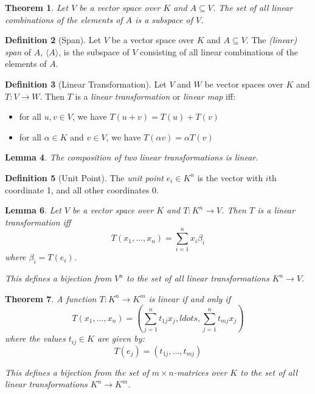 \documentclass{book}
\newtheorem{lm}{Lemma}[chapter]
\newtheorem{thm}[lm]{Theorem}
\theoremstyle{definition}
\newtheorem{df}[lm]{Definition}
\begin{document}
  \begin{thm}
    Let $V$ be a vector space over $K$ and $A \subseteq V$. The set of all 
    linear 
    combinations of the elements of $A$ is a subspace of $V$.
  \end{thm}
  
  \begin{df}[Span]
    Let $V$ be a vector space over $K$ and $A \subseteq V$. The \emph{(linear) 
      span} of $A$, $\langle A \rangle$, is the subspace of $V$ consisting of 
    all 
    linear 
    combinations of the elements of $A$.
  \end{df}
  
  \begin{df}[Linear Transformation]
    Let $V$ and $W$ be vector spaces over $K$ and $T : V \rightarrow W$. Then 
    $T$ 
    is a \emph{linear transformation} or \emph{linear map} iff:
    \begin{itemize}
      \item for all $u, v \in V$, we have $T(u + v) = T(u) + T(v)$
      \item for all $\alpha \in K$ and $v \in V$, we have $T(\alpha v) = \alpha 
      T(v)$
    \end{itemize}
  \end{df}
  
  \begin{lm}
    The composition of two linear transformations is linear.
  \end{lm}
  
  \begin{df}[Unit Point]
    The \emph{unit point} $e_i \in K^n$ is the vector with $i$th coordinate 1, 
    and all other coordinates 0.
  \end{df}
  
  \begin{lm}
    Let $V$ be a vector space over $K$ and $T : K^n \rightarrow V$. Then $T$ is 
    a 
    linear transformation iff
    \[ T(x_1, \ldots, x_n) = \sum_{i=1}^n x_i \beta_i \]
    where $\beta_i = T(e_i)$.
    
    This defines a bijection from $V^n$ to the set of all linear 
    transformations 
    $K^n \rightarrow V$.
  \end{lm}
  
  \begin{thm}
    A function $T : K^n \rightarrow K^m$ is linear if and only if
    \[ T(x_1, \ldots, x_n) = (\sum_{j=1}^n t_{1j} x_j, ldots, \sum_{j=1}^n 
    t_{mj} 
    x_j) \]
    where the values $t_{ij} \in K$ are given by:
    \[ T(e_j) = (t_{1j}, \ldots, t_{mj}) \]
    
    This defines a bijection from the set of $m \times n$-matrices over $K$ to 
    the 
    set of all linear transformations $K^n \rightarrow K^m$.
  \end{thm}
  
\end{document}
